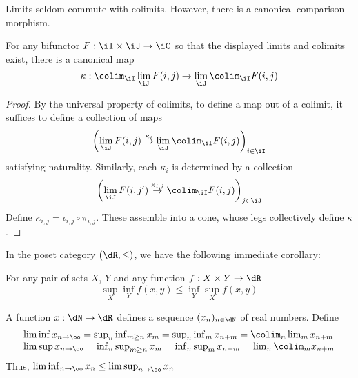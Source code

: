 \documentclass{amsart}
\begin{document}
Limits seldom commute with colimits.
However, there is a canonical comparison morphism.

\begin{thm}
  For any bifunctor $F : \iI \times \iJ \to \iC$ so that the displayed limits and colimits exist, there is a canonical map
  \[
    \kappa : \colim_{\iI}\lim_{\iJ}F(i,j) \to \lim_{\iJ}\colim_{\iI}F(i,j)
  \]
\end{thm}
\begin{proof}
  By the universal property of colimits, to define a map out of a colimit, it suffices to define a collection of maps
  \[
    \left( \lim_{\iJ}F(i,j) \overset{\kappa_{i}}{\to} \lim_{\iJ}\colim_{\iI}F(i,j) \right)_{i \in \iI}
  \]
  satisfying naturality.
  Similarly, each $\kappa_{i}$ is determined by a collection
  \[
    \left( \lim_{\iJ}F(i,j') \overset{\kappa_{i,j}}{\to} \colim_{\iI}F(i,j) \right)_{j \in \iJ}
  \]
  Define $\kappa_{i,j} = \iota_{i,j} \circ \pi_{i,j}$.
  These assemble into a cone, whose legs collectively define $\kappa$.
\end{proof}

\begin{eg}
  In the poset category $(\dR, \leq)$, we have the following immediate corollary:
  \begin{cor}
    For any pair of sets $X$, $Y$ and any function $f : X \times Y \to \dR$
    \[
      \sup_{X}\inf_{Y}f(x,y) \leq \inf_{Y}\sup_{X}f(x,y)
    \]
  \end{cor}
\end{eg}

\begin{eg}
  A function $x : \dN \to \dR$ defines a sequence $(x_{n})_{n \in \dN}$ of real numbers.
  Define
  \[
    \begin{array}{l}
      \liminf x_{n \to \oo} = \sup_{n}\inf_{m \geq n}x_{m} = \sup_{n}\inf_{m}x_{n+m} = \colim_{n}\lim_{m}x_{n+m}\\
      \limsup x_{n \to \oo} = \inf_{n}\sup_{m \geq n}x_{m} = \inf_{n}\sup_{m}x_{n+m} = \lim_{n}\colim_{m}x_{n+m}\\
    \end{array}
  \]
  Thus, $\liminf_{n \to \oo} x_{n} \leq \limsup_{n \to \oo} x_{n}$
\end{eg}



\end{document}
